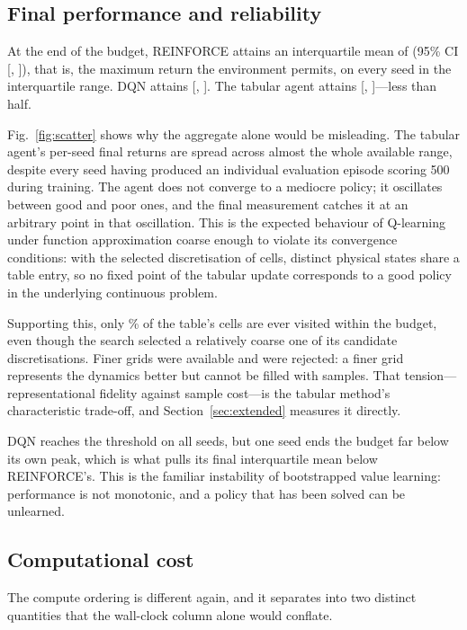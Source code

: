 \documentclass[conference]{IEEEtran}
\begin{document}
\subsection{Final performance and reliability}

At the end of the budget, REINFORCE attains an interquartile mean of \ReiFinal{}
(95\% CI [\ReiCiLow{}, \ReiCiHigh{}]), that is, the maximum return the environment
permits, on every seed in the interquartile range. DQN attains \DqnFinal{}
[\DqnCiLow{}, \DqnCiHigh{}]. The tabular agent attains \TabFinal{} [\TabCiLow{},
\TabCiHigh{}]---less than half.

Fig.~\ref{fig:scatter} shows why the aggregate alone would be misleading. The
tabular agent's per-seed final returns are spread across almost the whole
available range, despite every seed having produced an individual evaluation
episode scoring 500 during training. The agent does not converge to a mediocre policy; it oscillates
between good and poor ones, and the final measurement catches it at an arbitrary
point in that oscillation. This is the expected behaviour of Q-learning under
function approximation coarse enough to violate its convergence conditions: with
the selected discretisation of \TabCells{} cells, distinct physical states share a
table entry, so no fixed point of the tabular update corresponds to a good policy
in the underlying continuous problem.

Supporting this, only \TabCoverage{}\% of the table's cells are ever visited
within the budget, even though the search selected a relatively coarse one of its
candidate discretisations. Finer grids were available and were rejected: a finer
grid represents the dynamics better but cannot be filled with \StepBudget{}
samples. That tension---representational fidelity against sample cost---is the
tabular method's characteristic trade-off, and Section~\ref{sec:extended}
measures it directly.

DQN reaches the threshold on all \NumSeeds{} seeds, but one seed ends the budget
far below its own peak, which is what pulls its final interquartile mean below
REINFORCE's. This is the familiar instability of bootstrapped value learning:
performance is not monotonic, and a policy that has been solved can be unlearned.

\subsection{Computational cost}

The compute ordering is different again, and it separates into two distinct
quantities that the wall-clock column alone would conflate.
\end{document}
